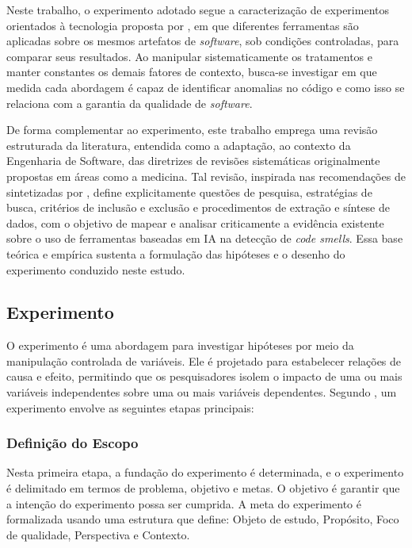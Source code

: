 Neste trabalho, o experimento adotado segue a caracterização de experimentos orientados à tecnologia proposta por 
, em que diferentes ferramentas são aplicadas sobre os mesmos artefatos de \textit{software}, 
sob condições controladas, para comparar seus resultados. Ao manipular sistematicamente os tratamentos e manter constantes os demais fatores de contexto, busca-se investigar 
em que medida cada abordagem é capaz de identificar anomalias no código e como isso se relaciona com a garantia da qualidade 
de \textit{software}.

De forma complementar ao experimento, este trabalho emprega uma revisão estruturada da literatura, entendida como a 
adaptação, ao contexto da Engenharia de Software, das diretrizes de revisões sistemáticas originalmente propostas em áreas 
como a medicina. Tal revisão, inspirada nas recomendações de  sintetizadas por 
, define explicitamente questões de pesquisa, estratégias de busca, critérios de inclusão 
e exclusão e procedimentos de extração e síntese de dados, com o objetivo de mapear e analisar criticamente a evidência 
existente sobre o uso de ferramentas baseadas em IA na detecção de \textit{code smells}. Essa base teórica e empírica sustenta 
a formulação das hipóteses e o desenho do experimento conduzido neste estudo.


\subsection{Experimento}

O experimento é uma abordagem para investigar hipóteses por meio da manipulação controlada de variáveis.
Ele é projetado para estabelecer relações de causa e efeito, permitindo que os pesquisadores isolem o impacto de uma ou mais variáveis 
independentes sobre uma ou mais variáveis dependentes. Segundo , um experimento envolve as seguintes etapas principais:

\subsubsection{Definição do Escopo}
Nesta primeira etapa, a fundação do experimento é determinada, e o experimento é delimitado em termos de problema, objetivo e metas.
O objetivo é garantir que a intenção do experimento possa ser cumprida.
A meta do experimento é formalizada usando uma estrutura que define: Objeto de estudo, Propósito, Foco de qualidade, Perspectiva e Contexto.

